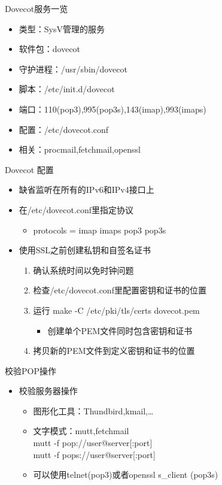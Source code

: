 \begin{frame}{Dovecot服务一览}
\begin{itemize}
\item 类型：SysV管理的服务
\item 软件包：dovecot
\item 守护进程：/usr/sbin/dovecot
\item 脚本：/etc/init.d/dovecot
\item 端口：110(pop3),995(pop3s),143(imap),993(imaps)
\item 配置：/etc/dovecot.conf
\item 相关：procmail,fetchmail,openssl
\end{itemize}

\end{frame} 
\begin{frame}{Dovecot 配置}
\begin{itemize}
\item 缺省监听在所有的IPv6和IPv4接口上
\item 在/etc/dovecot.conf里指定协议

\begin{itemize}
\item protocols = imap imaps pop3 pop3s
\end{itemize}
\item 使用SSL之前创建私钥和自签名证书

\begin{enumerate}
\item 确认系统时间以免时钟问题
\item 检查/etc/dovecot.conf里配置密钥和证书的位置
\item 运行 make -C /etc/pki/tls/certs dovecot.pem

\begin{itemize}
\item 创建单个PEM文件同时包含密钥和证书
\end{itemize}
\item 拷贝新的PEM文件到定义密钥和证书的位置
\end{enumerate}
\end{itemize}

\end{frame} 
\begin{frame}{校验POP操作}
\begin{itemize}
\item 校验服务器操作

\begin{itemize}
\item 图形化工具：Thundbird,kmail,\ldots{}
\item 文字模式：mutt,fetchmail\\
mutt -f pop://user@server{[}:port{]}\\
mutt -f pops://user@server{[}:port{]}
\item 可以使用telnet(pop3)或者openssl s\_client (pop3s)
\end{itemize}
\end{itemize}

\end{frame} 
